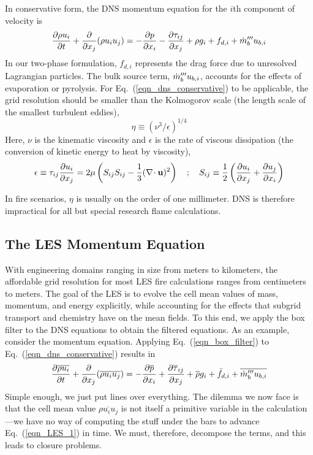 In conservative form, the DNS momentum equation for the $i$th component of velocity is
\begin{equation}
\label{eqn_dns_conservative}
\frac{\partial \rho u_i}{\partial t} + \frac{\partial}{\partial x_j} (\rho u_i u_j) = -\frac{\partial p}{\partial x_i} - \frac{\partial \tau_{ij}}{\partial x_j} + \rho g_i + f_{d,i} + \dot{m}_b^{\prime\prime\prime} u_{b,i}
\end{equation}
In our two-phase formulation, $f_{d,i}$ represents the drag force due to unresolved Lagrangian particles.  The bulk source term, $\dot{m}_b^{\prime\prime\prime} u_{b,i}$, accounts for the effects of evaporation or pyrolysis. For Eq.~(\ref{eqn_dns_conservative}) to be applicable, the grid resolution should be smaller than the Kolmogorov scale \cite{Pope:2000} (the length scale of the smallest turbulent eddies),
\begin{equation}
\label{eqn_kolmogorov_scale}
\eta \equiv (\nu^3/\epsilon)^{1/4}
\end{equation}
Here, $\nu$ is the kinematic viscosity and $\epsilon$ is the rate of viscous dissipation (the conversion of kinetic energy to heat by viscosity),
\begin{equation}
\epsilon \equiv \tau_{ij} \frac{\partial u_i}{\partial x_j} = 2 \mu \left( S_{ij} S_{ij} - \frac{1}{3} (\nabla\!\cdot {\bf u})^2 \right) \quad ; \quad S_{ij} \equiv \frac{1}{2}\left(\frac{\partial u_i}{\partial x_j} + \frac{\partial u_j}{\partial x_i}\right)
\end{equation}

In fire scenarios, $\eta$ is usually on the order of one millimeter.  DNS is therefore impractical for all but special research flame calculations.

\subsection{The LES Momentum Equation}

With engineering domains ranging in size from meters to kilometers, the affordable grid resolution for most LES fire calculations ranges from centimeters to meters.  The goal of the LES is to evolve the cell mean values of mass, momentum, and energy explicitly, while accounting for the effects that subgrid transport and chemistry have on the mean fields.  To this end, we apply the box filter to the DNS equations to obtain the filtered equations.  As an example, consider the momentum equation.  Applying Eq.~(\ref{eqn_box_filter}) to Eq.~(\ref{eqn_dns_conservative}) results in
\begin{equation}
\label{eqn_LES_1}
\frac{\partial \overline{\rho u_i}}{\partial t} + \frac{\partial}{\partial x_j} (\overline{\rho u_i u_j}) = -\frac{\partial \overline{p}}{\partial x_i} + \frac{\partial \overline{\tau}_{ij}}{\partial x_j} + \overline{\rho} g_i + \bar{f}_{d,i} + \overline{\dot{m}_b^{\prime\prime\prime} u_{b,i}}
\end{equation}
Simple enough, we just put lines over everything.  The dilemma we now face is that the cell mean value $\overline{\rho u_i u_j}$ is not itself a primitive variable in the calculation---we have no way of computing the stuff under the bars to advance Eq.~(\ref{eqn_LES_1}) in time.  We must, therefore, decompose the terms, and this leads to closure problems.

